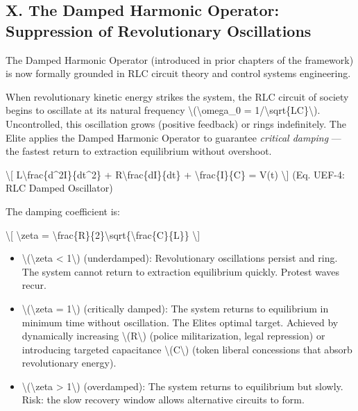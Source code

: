{\protect{}\label{sec-damped-harmonic}
\subsection{X. The Damped Harmonic Operator: Suppression of
Revolutionary
Oscillations}\label{x.-the-damped-harmonic-operator-suppression-of-revolutionary-oscillations}

The Damped Harmonic Operator (introduced in prior chapters of the
framework) is now formally grounded in RLC circuit theory and control
systems engineering.

When revolutionary kinetic energy strikes the system, the RLC circuit of
society begins to oscillate at its natural frequency
\textbackslash(\textbackslash omega\_0 =
1/\textbackslash sqrt\{LC\}\textbackslash). Uncontrolled, this
oscillation grows (positive feedback) or rings indefinitely. The Elite
applies the Damped Harmonic Operator to guarantee \emph{critical
damping} --- the fastest return to extraction equilibrium without
overshoot.

\textbackslash{[} L\textbackslash frac\{d\^{}2I\}\{dt\^{}2\} +
R\textbackslash frac\{dI\}\{dt\} + \textbackslash frac\{I\}\{C\} = V(t)
\textbackslash{]} {(Eq. UEF-4: RLC Damped Oscillator)}

The damping coefficient is:

\textbackslash{[} \textbackslash zeta =
\textbackslash frac\{R\}\{2\}\textbackslash sqrt\{\textbackslash frac\{C\}\{L\}\}
\textbackslash{]}

\begin{itemize}
\tightlist
\item
  \textbackslash(\textbackslash zeta \textless{} 1\textbackslash)
  (underdamped): Revolutionary oscillations persist and ring. The system
  cannot return to extraction equilibrium quickly. Protest waves recur.
\item
  \textbackslash(\textbackslash zeta = 1\textbackslash) (critically
  damped): The system returns to equilibrium in minimum time without
  oscillation. The Elite\textquotesingle s optimal target. Achieved by
  dynamically increasing \textbackslash(R\textbackslash) (police
  militarization, legal repression) or introducing targeted capacitance
  \textbackslash(C\textbackslash) (token liberal concessions that absorb
  revolutionary energy).
\item
  \textbackslash(\textbackslash zeta \textgreater{} 1\textbackslash)
  (overdamped): The system returns to equilibrium but slowly. Risk: the
  slow recovery window allows alternative circuits to form.
\end{itemize}

}
